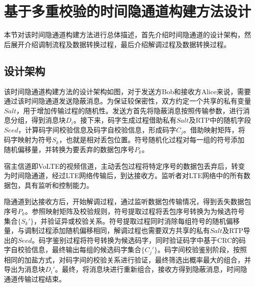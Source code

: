 \section{基于多重校验的时间隐通道构建方法设计}
\label{chap:hash:designation}

本节对该时间隐通道构建方法进行总体描述，首先介绍时间隐通道的设计架构，然后展开介绍调制流程及数据转换过程，最后介绍解调过程及数据转换过程。

\subsection{设计架构}
\label{chap:hash:designation:model}


该时间隐通道构建方法的设计架构如图，对于发送方Bob和接收方Alice来说，需要通过该时间隐通道发送隐蔽消息。为保证较保密性，双方约定一个共享的私有变量$Salt$，用于增加传输过程的随机性。发送方首先将隐蔽消息按照传输参数，进行消息分组，得到消息块$D_{i}$。接下来，码字生成过程借助私有$Salt$及RTP中的随机字段$Seed$，计算码字间校验信息及码字自校验信息，形成码字$C_{j}$。借助映射矩阵，将码字映射为符号$S_{k}$，也就是相对丢包位置。符号随机化过程对每一组的符号添加随机偏移量，并转换为要丢弃的数据包序号$P_{k}$。

宿主信道即VoLTE的视频信道，主动丢包过程将特定序号的数据包丢弃后，转变为时间隐通道，经过LTE网络传输后，到达接收方。监听者对LTE网络中的所有数据包，具有监听和控制能力。

隐通道到达接收方后，开始解调过程，通过监听数据包传输情况，得到丢失数据包序号$P_{k}$。参照映射矩阵及校验规则，符号提取过程将丢包序号转换为为候选符号集合$\{S_{k}'\}$，并验证异或校验关系。符号提取过程同时消除每组符号的随机偏移量，与调制过程添加随机偏移相同，解调过程也需要双方共享的私有$Salt$及RTP导出的$Seed$。码字鉴别过程将符号转换为候选码字，同时验证码字中基于CRC的码字自校验信息，最终输出每组的候选码字集合$\{C_{j}'\}$。码字间校验鉴别阶段，按照相同的加盐方式，对码字间的校验关系进行验证，最终筛选出概率最大的组合，并导出为消息块$D_{i}'$。最终，将消息块进行重新组合，接收方得到隐蔽消息，时间隐通道传输过程结束。

